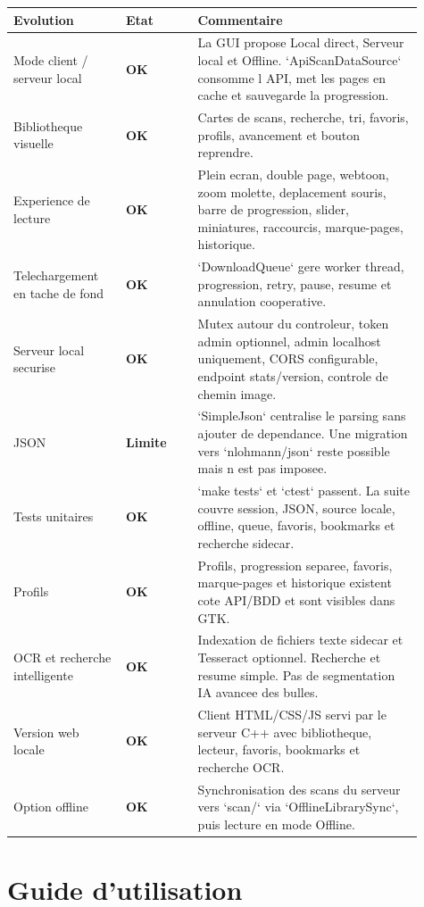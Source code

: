 \documentclass[11pt,a4paper]{article}
\newcommand{\ok}{\textcolor{sggreen}{\textbf{OK}}}
\newcommand{\limit}{\textcolor{sgorange}{\textbf{Limite}}}
\begin{document}
\renewcommand{\arraystretch}{1.25}
\begin{longtable}{p{0.25\linewidth}p{0.16\linewidth}p{0.50\linewidth}}
\toprule
Evolution & Etat & Commentaire \\
\midrule
\endhead
Mode client / serveur local & \ok{} & La GUI propose Local direct, Serveur local et Offline. `ApiScanDataSource` consomme l API, met les pages en cache et sauvegarde la progression. \\
Bibliotheque visuelle & \ok{} & Cartes de scans, recherche, tri, favoris, profils, avancement et bouton reprendre. \\
Experience de lecture & \ok{} & Plein ecran, double page, webtoon, zoom molette, deplacement souris, barre de progression, slider, miniatures, raccourcis, marque-pages, historique. \\
Telechargement en tache de fond & \ok{} & `DownloadQueue` gere worker thread, progression, retry, pause, resume et annulation cooperative. \\
Serveur local securise & \ok{} & Mutex autour du controleur, token admin optionnel, admin localhost uniquement, CORS configurable, endpoint stats/version, controle de chemin image. \\
JSON & \limit{} & `SimpleJson` centralise le parsing sans ajouter de dependance. Une migration vers `nlohmann/json` reste possible mais n est pas imposee. \\
Tests unitaires & \ok{} & `make tests` et `ctest` passent. La suite couvre session, JSON, source locale, offline, queue, favoris, bookmarks et recherche sidecar. \\
Profils & \ok{} & Profils, progression separee, favoris, marque-pages et historique existent cote API/BDD et sont visibles dans GTK. \\
OCR et recherche intelligente & \ok{} & Indexation de fichiers texte sidecar et Tesseract optionnel. Recherche et resume simple. Pas de segmentation IA avancee des bulles. \\
Version web locale & \ok{} & Client HTML/CSS/JS servi par le serveur C++ avec bibliotheque, lecteur, favoris, bookmarks et recherche OCR. \\
Option offline & \ok{} & Synchronisation des scans du serveur vers `scan/` via `OfflineLibrarySync`, puis lecture en mode Offline. \\

\bottomrule
\end{longtable}
\section{Guide d'utilisation}
\end{document}
